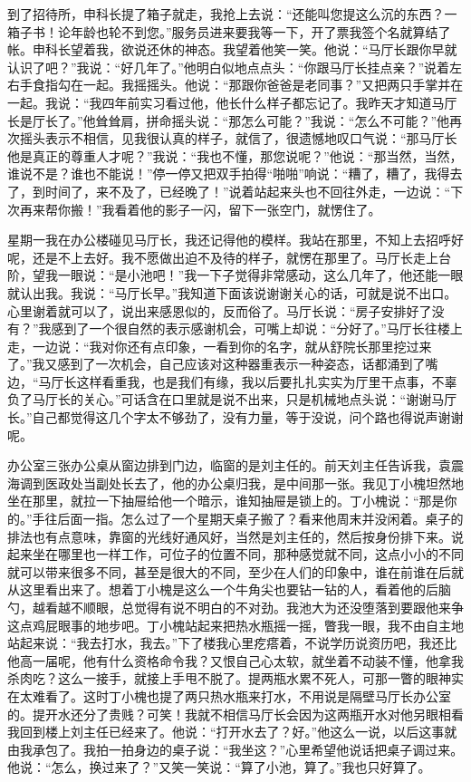 \documentclass[12pt,oneside]{book}
\begin{document}
到了招待所，申科长提了箱子就走，我抢上去说：``还能叫您提这么沉的东西？一箱子书！论年龄也轮不到您。''服务员进来要我等一下，开了票我签个名就算结了帐。申科长望着我，欲说还休的神态。我望着他笑一笑。他说：``马厅长跟你早就认识了吧？''我说：``好几年了。''他明白似地点点头：``你跟马厅长挂点亲？''说着左右手食指勾在一起。我摇摇头。他说：``那跟你爸爸是老同事？''又把两只手掌并在一起。我说：``我四年前实习看过他，他长什么样子都忘记了。我昨天才知道马厅长是厅长了。''他耸耸肩，拼命摇头说：``那怎么可能？''我说：``怎么不可能？''他再次摇头表示不相信，见我很认真的样子，就信了，很遗憾地叹口气说：``那马厅长他是真正的尊重人才呢？''我说：``我也不懂，那您说呢？''他说：``那当然，当然，谁说不是？谁也不能说！''停一停又把双手拍得``啪啪''响说：``糟了，糟了，我得去了，到时间了，来不及了，已经晚了！''说着站起来头也不回往外走，一边说：``下次再来帮你搬！''我看着他的影子一闪，留下一张空门，就愣住了。

星期一我在办公楼碰见马厅长，我还记得他的模样。我站在那里，不知上去招呼好呢，还是不上去好。我不愿做出迫不及待的样子，就愣在那里了。马厅长走上台阶，望我一眼说：``是小池吧！''我一下子觉得非常感动，这么几年了，他还能一眼就认出我。我说：``马厅长早。''我知道下面该说谢谢关心的话，可就是说不出口。心里谢着就可以了，说出来感恩似的，反而俗了。马厅长说：``房子安排好了没有？''我感到了一个很自然的表示感谢机会，可嘴上却说：``分好了。''马厅长往楼上走，一边说：``我对你还有点印象，一看到你的名字，就从舒院长那里挖过来了。''我又感到了一次机会，自己应该对这种器重表示一种姿态，话都涌到了嘴边，``马厅长这样看重我，也是我们有缘，我以后要扎扎实实为厅里干点事，不辜负了马厅长的关心。''可话含在口里就是说不出来，只是机械地点头说：``谢谢马厅长。''自己都觉得这几个字太不够劲了，没有力量，等于没说，问个路也得说声谢谢呢。

办公室三张办公桌从窗边排到门边，临窗的是刘主任的。前天刘主任告诉我，袁震海调到医政处当副处长去了，他的办公桌归我，是中间那一张。我见丁小槐坦然地坐在那里，就拉一下抽屉给他一个暗示，谁知抽屉是锁上的。丁小槐说：``那是你的。''手往后面一指。怎么过了一个星期天桌子搬了？看来他周末并没闲着。桌子的排法也有点意味，靠窗的光线好通风好，当然是刘主任的，然后按身份排下来。说起来坐在哪里也一样工作，可位子的位置不同，那种感觉就不同，这点小小的不同就可以带来很多不同，甚至是很大的不同，至少在人们的印象中，谁在前谁在后就从这里看出来了。想着丁小槐是这么一个牛角尖也要钻一钻的人，看着他的后脑勺，越看越不顺眼，总觉得有说不明白的不对劲。我池大为还没堕落到要跟他来争这点鸡屁眼事的地步吧。丁小槐站起来把热水瓶摇一摇，瞥我一眼，我不由自主地站起来说：``我去打水，我去。''下了楼我心里疙瘩着，不说学历说资历吧，我还比他高一届呢，他有什么资格命令我？又恨自己心太软，就坐着不动装不懂，他拿我杀肉吃？这么一接手，就接上手甩不脱了。提两瓶水累不死人，可那一瞥的眼神实在太难看了。这时丁小槐也提了两只热水瓶来打水，不用说是隔壁马厅长办公室的。提开水还分了贵贱？可笑！我就不相信马厅长会因为这两瓶开水对他另眼相看我回到楼上刘主任已经来了。他说：``打开水去了？好。''他这么一说，以后这事就由我承包了。我拍一拍身边的桌子说：``我坐这？''心里希望他说话把桌子调过来。他说：``怎么，换过来了？''又笑一笑说：``算了小池，算了。''我也只好算了。
\end{document}
